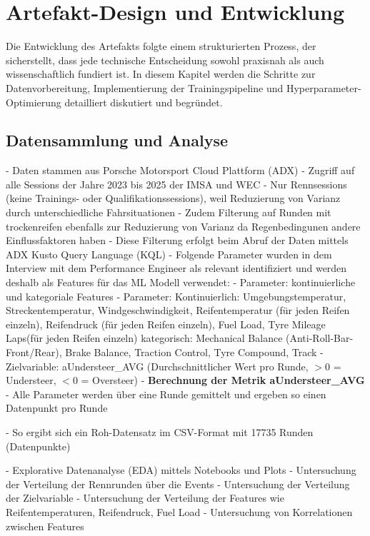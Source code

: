 \chapter{Artefakt-Design und Entwicklung}

Die Entwicklung des Artefakts folgte einem strukturierten Prozess, der sicherstellt, dass jede technische Entscheidung sowohl praxisnah als auch wissenschaftlich fundiert ist. In diesem Kapitel werden die Schritte zur Datenvorbereitung, Implementierung der Trainingspipeline und Hyperparameter-Optimierung detailliert diskutiert und begründet.

\section{Datensammlung und Analyse}

- Daten stammen aus Porsche Motorsport Cloud Plattform (ADX)
- Zugriff auf alle Sessions der Jahre 2023 bis 2025 der IMSA und WEC 
- Nur Rennsessions (keine Trainings- oder Qualifikationssessions), weil Reduzierung von Varianz durch unterschiedliche Fahrsituationen
- Zudem Filterung auf Runden mit trockenreifen ebenfalls zur Reduzierung von Varianz da Regenbedingunen andere Einflussfaktoren haben
- Diese Filterung erfolgt beim Abruf der Daten mittels ADX Kusto Query Language (KQL)
- Folgende Parameter wurden in dem Interview mit dem Performance Engineer als relevant identifiziert und werden deshalb als Features für das ML Modell verwendet:
- Parameter: kontinuierliche und kategoriale Features
- Parameter: 
Kontinuierlich: Umgebungstemperatur, Streckentemperatur, Windgeschwindigkeit, Reifentemperatur (für jeden Reifen einzeln), Reifendruck (für jeden Reifen einzeln), Fuel Load, Tyre Mileage Laps(für jeden Reifen einzeln)
kategorisch: Mechanical Balance (Anti-Roll-Bar-Front/Rear), Brake Balance, Traction Control, Tyre Compound, Track
- Zielvariable: aUndersteer\_AVG (Durchschnittlicher Wert pro Runde, $>0$ = Understeer, $<0$ = Oversteer)
- \textbf{Berechnung der Metrik aUndersteer\_AVG}
- Alle Parameter werden über eine Runde gemittelt und ergeben so einen Datenpunkt pro Runde


- So ergibt sich ein Roh-Datensatz im CSV-Format mit 17735 Runden (Datenpunkte) 

- Explorative Datenanalyse (EDA) mittels Notebooks und Plots 
- Untersuchung der Verteilung der Rennrunden über die Events
- Untersuchung der Verteilung der Zielvariable
- Untersuchung der Verteilung der Features wie Reifentemperaturen, Reifendruck, Fuel Load
- Untersuchung von Korrelationen zwischen Features





